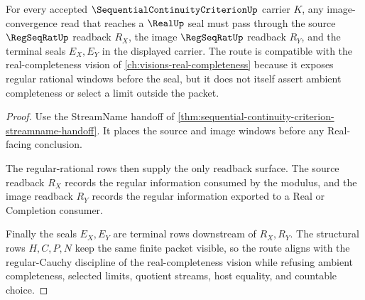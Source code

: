 \begin{theorem}
\label{thm:sequential-continuity-criterion-regseqrat-real-seal}
For every accepted $\SequentialContinuityCriterionUp$ carrier $K$, any image-convergence read that reaches a $\RealUp$ seal must pass through the source $\RegSeqRatUp$ readback $R_X$, the image $\RegSeqRatUp$ readback $R_Y$, and the terminal seals $E_X,E_Y$ in the displayed carrier. The route is compatible with the real-completeness vision of \autoref{ch:visions-real-completeness} because it exposes regular rational windows before the seal, but it does not itself assert ambient completeness or select a limit outside the packet.
\end{theorem}
\begin{proof}
Use the StreamName handoff of \autoref{thm:sequential-continuity-criterion-streamname-handoff}. It places the source and image windows before any Real-facing conclusion.

The regular-rational rows then supply the only readback surface. The source readback $R_X$ records the regular information consumed by the modulus, and the image readback $R_Y$ records the regular information exported to a Real or Completion consumer.

Finally the seals $E_X,E_Y$ are terminal rows downstream of $R_X,R_Y$. The structural rows $H,C,P,N$ keep the same finite packet visible, so the route aligns with the regular-Cauchy discipline of the real-completeness vision while refusing ambient completeness, selected limits, quotient streams, host equality, and countable choice.
\end{proof}


\begin{closurestatus}{\SequentialContinuityCriterionUp}
  \theoryclosure{\seedClosure}
  \formalstatus{\unformalizedV}
\end{closurestatus}
